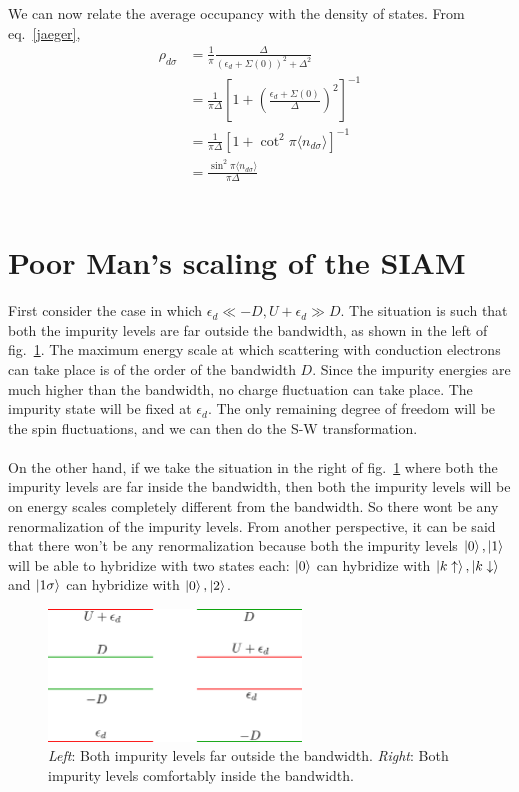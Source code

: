 \documentclass[twoside,11pt]{report}
\numberwithin{equation}{section}
\begin{document}
We can now relate the average occupancy with the density of states.
From eq.~\ref{jaeger},
\begin{equation}\begin{aligned}
	\rho_{d\sigma} &= \frac{1}{\pi}\frac{\Delta}{\left(\epsilon_d + \Sigma(0)\right)^2 + \Delta^2}\\
		       &= \frac{1}{\pi\Delta}\left[1+\left(\frac{\epsilon_d+\Sigma(0)}{\Delta}\right)^2\right]^{-1}\\
		       &=\frac{1}{\pi\Delta}\left[1+\cot^2\pi\langle  n_{d\sigma}\rangle\right]^{-1}\\
		       &=\frac{\sin^2 \pi\langle  n_{d\sigma}\rangle}{\pi \Delta}
\end{aligned}\end{equation}
\\

\section{Poor Man's scaling of the SIAM}
First consider the case in which \(\epsilon_d \ll -D, U+\epsilon_d \gg D\).
The situation is such that both the impurity levels are far outside the bandwidth, as shown in the left of fig.~\ref{and}.
The maximum energy scale at which scattering with conduction electrons can take place is of the order of the bandwidth \(D\).
Since the impurity energies are much higher than the bandwidth, no charge fluctuation can take place.
The impurity state will be fixed at \(\epsilon_d\).
The only remaining degree of freedom will be the spin fluctuations, and we can then do the S-W transformation.\\\\
On the other hand, if we take the situation in the right of fig.~\ref{and} where both the impurity levels are far inside the bandwidth, then both the impurity levels will be on energy scales completely different from the bandwidth.
So there wont be any renormalization of the impurity levels.
From another perspective, it can be said that there won't be any renormalization because both the impurity levels \(\ket{0},\ket{1}\) will be able to hybridize with two states each: \(\ket{0}\) can hybridize with \(\ket{k\uparrow},\ket{k\downarrow}\) and \(\ket{1\sigma}\) can hybridize with \(\ket{0},\ket{2}\).

\begin{figure}
    \centering
    \includegraphics[width=0.6\textwidth]{../figures/anderson.png}
    \caption{\textit{Left}: Both impurity levels far outside the bandwidth. \textit{Right}: Both impurity levels comfortably inside the bandwidth.}
    \label{and}
\end{figure}
\end{document}
